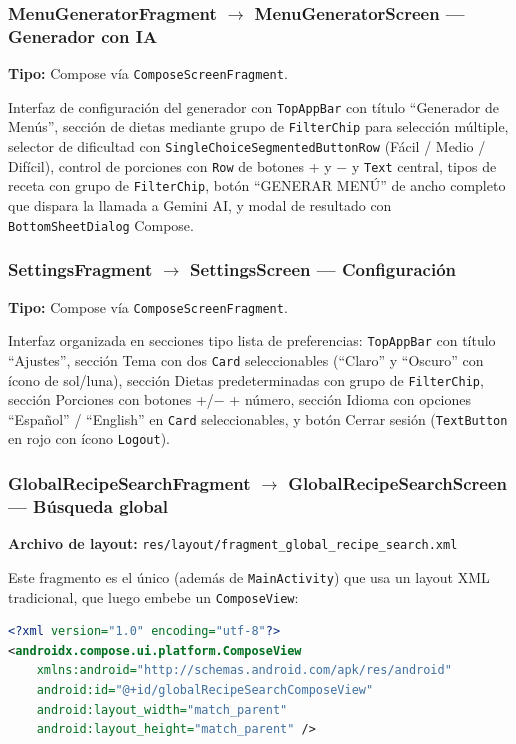 \documentclass[stu, 12pt, letterpaper, donotrepeattitle, floatsintext, natbib]{apa7}
\begin{document}
\subsubsection{MenuGeneratorFragment $\rightarrow$ MenuGeneratorScreen --- Generador con IA}

\noindent\textbf{Tipo:} Compose vía \texttt{ComposeScreenFragment}.

Interfaz de configuración del generador con \texttt{TopAppBar} con título ``Generador
de Menús'', sección de dietas mediante grupo de \texttt{FilterChip} para selección
múltiple, selector de dificultad con \texttt{SingleChoiceSegmentedButtonRow} (Fácil /
Medio / Difícil), control de porciones con \texttt{Row} de botones + y $-$ y
\texttt{Text} central, tipos de receta con grupo de \texttt{FilterChip}, botón
``GENERAR MENÚ'' de ancho completo que dispara la llamada a Gemini AI, y modal de
resultado con \texttt{BottomSheetDialog} Compose.

\subsubsection{SettingsFragment $\rightarrow$ SettingsScreen --- Configuración}

\noindent\textbf{Tipo:} Compose vía \texttt{ComposeScreenFragment}.

Interfaz organizada en secciones tipo lista de preferencias: \texttt{TopAppBar} con
título ``Ajustes'', sección Tema con dos \texttt{Card} seleccionables (``Claro'' y
``Oscuro'' con ícono de sol/luna), sección Dietas predeterminadas con grupo de
\texttt{FilterChip}, sección Porciones con botones +/$-$ + número, sección Idioma con
opciones ``Español'' / ``English'' en \texttt{Card} seleccionables, y botón Cerrar
sesión (\texttt{TextButton} en rojo con ícono \texttt{Logout}).

\subsubsection{GlobalRecipeSearchFragment $\rightarrow$ GlobalRecipeSearchScreen --- Búsqueda global}

\noindent\textbf{Archivo de layout:} \texttt{res/layout/fragment\_global\_recipe\_search.xml}

Este fragmento es el único (además de \texttt{MainActivity}) que usa un layout XML
tradicional, que luego embebe un \texttt{ComposeView}:

\begin{lstlisting}[language=XML, caption={Layout XML de fragment\_global\_recipe\_search.xml}]
<?xml version="1.0" encoding="utf-8"?>
<androidx.compose.ui.platform.ComposeView
    xmlns:android="http://schemas.android.com/apk/res/android"
    android:id="@+id/globalRecipeSearchComposeView"
    android:layout_width="match_parent"
    android:layout_height="match_parent" />
\end{lstlisting}
\end{document}
